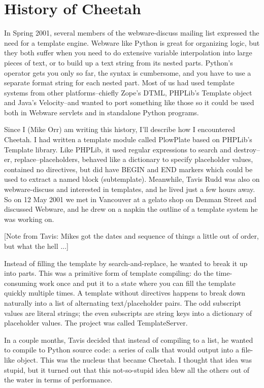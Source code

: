 \section{History of Cheetah}
\label{history}

In Spring 2001, several members of the webware-discuss mailing list expressed
the need for a template engine.  Webware like Python is great for organizing
logic, but they both suffer when you need to do extensive variable
interpolation into large pieces of text, or to build up a text string from its
nested parts.  Python's \code{\%} operator gets you only so far, the syntax is
cumbersome, and you have to use a separate format string for each nested part.
Most of us had used template systems from other platforms--chiefly Zope's DTML,
PHPLib's Template object and Java's Velocity--and wanted to port something like
those so it could be used both in Webware servlets and in standalone Python
programs.  


Since I (Mike Orr) am writing this history, I'll describe how I encountered
Cheetah.  I had written a template module called PlowPlate based on PHPLib's
Template library.  Like PHPLib, it used regular expressions to search
and destroy--er, replace--placeholders, behaved like a dictionary to
specify placeholder values, contained no directives, but did have BEGIN and
END markers which could be used to extract a named block (subtemplate).
Meanwhile, Tavis Rudd was also on webware-discuss and interested in templates,
and he lived just a few hours away.  So on 12 May 2001 we met in Vancouver at
a gelato shop on Denman Street and discussed Webware, and he drew on a napkin
the outline of a template system he was working on.  

[Note from Tavis: Mikes got the dates and sequence of things a little out of order,
but what the hell ...]

Instead of filling the template by search-and-replace, he wanted to break it up
into parts.  This was a primitive form of template compiling: do the
time-consuming work once and put it to a state where you can fill the template
quickly multiple times.  A template without directives happens to break down
naturally into a list of alternating text/placeholder pairs.  The odd
subscript values are literal strings; the even subscripts are string keys into
a dictionary of placeholder values.  The project was called TemplateServer.

In a couple months, Tavis decided that instead of compiling to a list, he
wanted to compile to Python source code: a series of  calls that
would output into a file-like object.  This was the nucleus that became
Cheetah.  I thought that idea was stupid, but it turned out that this
not-so-stupid idea blew all the others out of the water in terms of
performance.  

